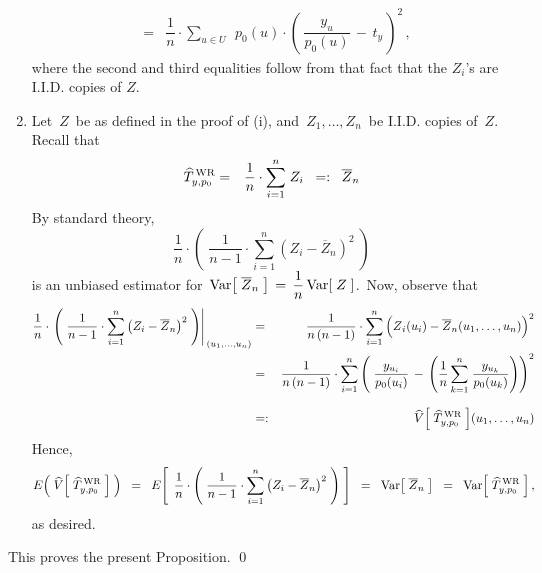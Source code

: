 \begin{enumerate}
\begin{eqnarray*}
	\\
	& = &
		\dfrac{1}{n}\cdot
		\underset{u \in U}{\sum}\;\,
		p_{0}(u)\cdot\left(\,\dfrac{y_{u}}{p_{0}(u)}\,-\,t_{y}\,\right)^{2}\,,
	\end{eqnarray*}
	where the second and third equalities follow from that fact that
	the $Z_{i}$'s are I.I.D. copies of $Z$.
\item
	Let \,$Z$\, be as defined in the proof of (i), and
	\,$Z_{1}, \ldots, Z_{n}$\, be I.I.D. copies of \,$Z$.\,
	Recall that
	\begin{eqnarray*}
	\widehat{T}^{\,\textnormal{WR}}_{y,p_{0}}
	&=&
		\dfrac{1}{n}\cdot \overset{n}{\underset{i = 1}{\sum}}\; Z_{i}
	\;\; =: \;\;
		\overline{Z}_{n}
	\end{eqnarray*}
	By standard theory,
	\begin{equation*}
	\dfrac{1}{n}\cdot\left(\;
		\dfrac{1}{n-1}\cdot\overset{n}{\underset{i=1}{\sum}} \left(Z_{i} - \overline{Z}_{n}\right)^{2}
		\;\right)
	\end{equation*}
	is an unbiased estimator for
	\,$\textnormal{Var}\!\left[\;\overline{Z}_{n}\;\right] \,=\, \dfrac{1}{n}\,\textnormal{Var}\!\left[\;Z\;\right]$.\,
	Now, observe that
	\begin{eqnarray*}
	\dfrac{1}{n}\cdot\left.\left(\;
		\dfrac{1}{n-1}\cdot\overset{n}{\underset{i=1}{\sum}} \left(Z_{i} - \overline{Z}_{n}\right)^{2}
		\;\right)\right\vert_{\,(u_{1},\ldots,u_{n})}
	& = &
		\dfrac{1}{n\,(n-1)}\cdot
		\overset{n}{\underset{i=1}{\sum}}\left(
			\overset{{\color{white}.}}{Z}_{i}(u_{i}) - \overline{Z}_{n}(u_{1},\ldots,u_{n})
			\right)^{2}
	\\
	& = &
		\dfrac{1}{n\,(n-1)}\cdot
			\overset{n}{\underset{i=1}{\sum}}\left(\;
				\dfrac{y_{u_{i}}}{p_{0}(u_{i})}
				\,-\,
				\left(\dfrac{1}{n}\,\overset{n}{\underset{k=1}{\sum}}\;\dfrac{y_{u_{k}}}{p_{0}(u_{k})}\right)
				\right)^{2}
	\\
	& =: &
		\overset{{\color{white}1}}{
			\widehat{V}\!\left[\;\widehat{T}^{\,\textnormal{WR}}_{y,p_{0}}\;\right]\!(u_{1},\ldots,u_{n})
			}
	\end{eqnarray*}
	Hence,
	\begin{equation*}
	E\!\left(\;
		\widehat{V}\!\left[\;\widehat{T}^{\,\textnormal{WR}}_{y,p_{0}}\;\right]
		\;\right)
	\;\; = \;\;
		E\!\left[\;\,
			\dfrac{1}{n}\cdot\left(\;
				\dfrac{1}{n-1}\cdot\overset{n}{\underset{i=1}{\sum}} \left(Z_{i} - \overline{Z}_{n}\right)^{2}
				\;\right)
			\;\right]
	\;\; = \;\;
		\textnormal{Var}\!\left[\;\overline{Z}_{n}\;\right]
	\;\; = \;\;
		\textnormal{Var}\!\left[\;\widehat{T}^{\,\textnormal{WR}}_{y,p_{0}}\;\right],
	\end{equation*}
	as desired.
\end{enumerate}
This proves the present Proposition.
\qed

